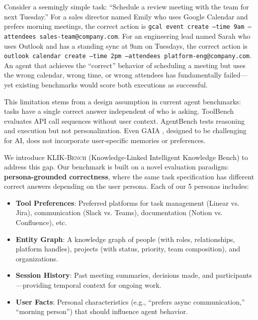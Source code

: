 \documentclass{article}
\newcommand{\klikbench}{\textsc{KLIK-Bench}}
\begin{document}
Consider a seemingly simple task: ``Schedule a review meeting with the team for next Tuesday.'' For a sales director named Emily who uses Google Calendar and prefers morning meetings, the correct action is \texttt{gcal event create --time 9am --attendees sales-team@company.com}. For an engineering lead named Sarah who uses Outlook and has a standing sync at 9am on Tuesdays, the correct action is \texttt{outlook calendar create --time 2pm --attendees platform-eng@company.com}. An agent that achieves the ``correct'' behavior of scheduling a meeting but uses the wrong calendar, wrong time, or wrong attendees has fundamentally failed---yet existing benchmarks would score both executions as successful.

This limitation stems from a design assumption in current agent benchmarks: tasks have a single correct answer independent of who is asking. ToolBench \citep{toolbench2023} evaluates API call sequences without user context. AgentBench \citep{agentbench2023} tests reasoning and execution but not personalization. Even GAIA \citep{gaia2023}, designed to be challenging for AI, does not incorporate user-specific memories or preferences.

We introduce \klikbench{} (Knowledge-Linked Intelligent Knowledge Bench) to address this gap. Our benchmark is built on a novel evaluation paradigm: \textbf{persona-grounded correctness}, where the same task specification has different correct answers depending on the user persona. Each of our 5 personas includes:

\begin{itemize}[leftmargin=*, itemsep=2pt]
    \item \textbf{Tool Preferences}: Preferred platforms for task management (Linear vs. Jira), communication (Slack vs. Teams), documentation (Notion vs. Confluence), etc.
    \item \textbf{Entity Graph}: A knowledge graph of people (with roles, relationships, platform handles), projects (with status, priority, team composition), and organizations.
    \item \textbf{Session History}: Past meeting summaries, decisions made, and participants---providing temporal context for ongoing work.
    \item \textbf{User Facts}: Personal characteristics (e.g., ``prefers async communication,'' ``morning person'') that should influence agent behavior.
\end{itemize}
\end{document}
